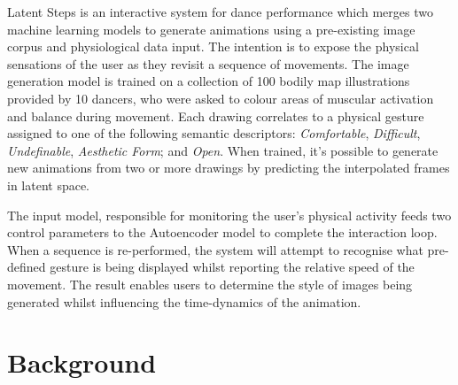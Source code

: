 Latent Steps is an interactive system for dance performance which merges two machine learning models to generate animations using a pre-existing image corpus and physiological data input. The intention is to expose the physical sensations of the user as they revisit a sequence of movements.
The image generation model is trained on a collection of 100 bodily map illustrations provided by 10 dancers, who were asked to colour areas of muscular activation and balance during movement. Each drawing correlates to a physical gesture assigned to one of the following semantic descriptors: \textit{Comfortable}, \textit{Difficult}, \textit{Undefinable}, \textit{Aesthetic Form}; and \textit{Open}. When trained, it’s possible to generate new animations from two or more drawings by predicting the interpolated frames in latent space.

The input model, responsible for monitoring the user’s physical activity feeds two control parameters to the Autoencoder model to complete the interaction loop. When a sequence is re-performed, the system will attempt to recognise what pre-defined gesture is being displayed whilst reporting the relative speed of the movement. The result enables users to determine the style of images being generated whilst influencing the time-dynamics of the animation.

\section{Background}

